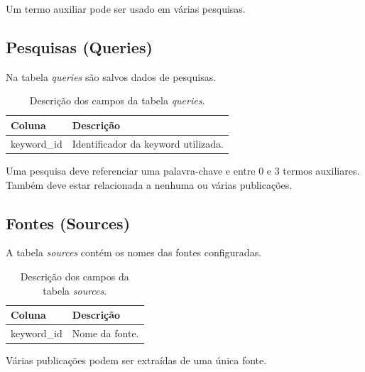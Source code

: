 Um termo auxiliar pode ser usado em várias pesquisas.

\subsection{Pesquisas (Queries)}
\label{subsec: Queries}
Na tabela \textit{queries} são salvos dados de pesquisas. 
\begin{table}[ht]
    \begin{tabular}{|p{3cm}|p{12cm}|}
        \hline
        \rowcolor[HTML]{CFCFCF} 
        Coluna      & Descrição  \\ \hline
        keyword\_id & Identificador da keyword utilizada. \\ \hline
    \end{tabular}
    \caption{Descrição dos campos da tabela \textit{queries}.}
    \label{fig: DescricaoTabelaPesquisas}
\end{table}

Uma pesquisa deve referenciar uma palavra-chave e entre 0 e 3 termos auxiliares.
Também deve estar relacionada a nenhuma ou várias publicações.

\subsection{Fontes (Sources)}
\label{subsec: Sources}
A tabela \textit{sources} contém os nomes das fontes configuradas.
\begin{table}[ht]
    \begin{tabular}{|p{3cm}|p{12cm}|}
        \hline
        \rowcolor[HTML]{CFCFCF} 
        Coluna      & Descrição  \\ \hline
        keyword\_id & Nome da fonte. \\ \hline
    \end{tabular}
    \caption{Descrição dos campos da tabela \textit{sources}.}
    \label{fig: DescricaoTabelaFontes}
\end{table}

Várias publicações podem ser extraídas de uma única fonte.

